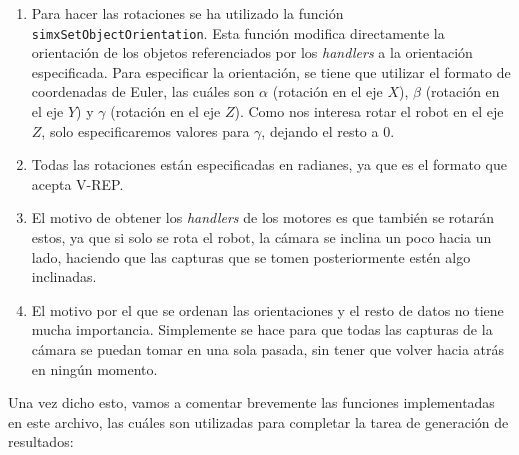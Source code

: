\documentclass[11pt,a4paper]{article}
\begin{document}
\begin{enumerate}
	\item Para hacer las rotaciones se ha utilizado la función \texttt{simxSetObjectOrientation}.
	Esta función modifica directamente la orientación de los objetos referenciados por los \textit{handlers}
	a la orientación especificada. Para especificar la orientación, se tiene que utilizar el formato
	de coordenadas de Euler, las cuáles son $\alpha$ (rotación en el eje $X$), $\beta$
	(rotación en el eje $Y$) y $\gamma$ (rotación en el eje $Z$). Como nos interesa rotar
	el robot en el eje $Z$, solo especificaremos valores para $\gamma$, dejando el resto a 0.
	\item Todas las rotaciones están especificadas en radianes, ya que es el formato que acepta
	V-REP.
	\item El motivo de obtener los \textit{handlers} de los motores es que también
	se rotarán estos, ya que si solo se rota el robot, la cámara se inclina un poco hacia
	un lado, haciendo que las capturas que se tomen posteriormente estén algo inclinadas.
	\item El motivo por el que se ordenan las orientaciones y el resto de datos no tiene
	mucha importancia. Simplemente se hace para que todas las capturas de la cámara se puedan
	tomar en una sola pasada, sin tener que volver hacia atrás en ningún momento.
\end{enumerate}

Una vez dicho esto, vamos a comentar brevemente las funciones implementadas en este
archivo, las cuáles son utilizadas para completar la tarea de generación de resultados:
\end{document}
